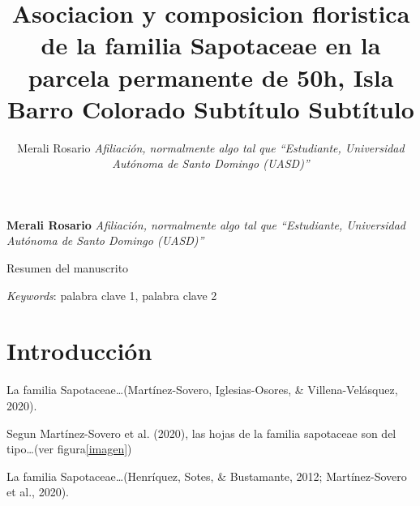 \documentclass[11pt,]{article}
\title{\textbar{} Asociacion y composicion floristica de la familia Sapotaceae
en la parcela permanente de 50h, Isla Barro Colorado \textbar{}Subtítulo
\textbar{} Subtítulo  }
\author{\Large Merali Rosario\vspace{0.05in} \newline\normalsize\emph{Afiliación, normalmente algo tal que ``Estudiante, Universidad Autónoma
de Santo Domingo (UASD)''}  }
\date{}
\newcommand*{\authorfont}{\fontfamily{phv}\selectfont}
\renewenvironment{abstract}
 {{%
    \setlength{\leftmargin}{0mm}
    \setlength{\rightmargin}{\leftmargin}%
  }%
  \relax}
 {\endlist}
\begin{document}
	
%

{%
\setlength{\parindent}{0pt}
\thispagestyle{plain}
{\fontsize{18}{20}\selectfont\raggedright 
\maketitle  %

}

{
   \vskip 13.5pt\relax \normalsize\fontsize{11}{12} 
\textbf{\authorfont Merali Rosario} \hskip 15pt \emph{\small Afiliación, normalmente algo tal que ``Estudiante, Universidad Autónoma
de Santo Domingo (UASD)''}   

}

}








\begin{abstract}

    \hbox{\vrule height .2pt width 39.14pc}

    \vskip 8.5pt %

\noindent Resumen del manuscrito


\vskip 8.5pt \noindent \emph{Keywords}: palabra clave 1, palabra clave 2 \par

    \hbox{\vrule height .2pt width 39.14pc}



\end{abstract}


\vskip 6.5pt


\noindent  \section{Introducción}\label{introducciuxf3n}

La familia Sapotaceae\ldots{}(Martínez-Sovero, Iglesias-Osores, \&
Villena-Velásquez, 2020).

Segun Martínez-Sovero et al. (2020), las hojas de la familia sapotaceae
son del tipo\ldots{}(ver figura\ref{imagen})

La familia Sapotaceae\ldots{}(Henríquez, Sotes, \& Bustamante, 2012;
Martínez-Sovero et al., 2020).
\end{document}
